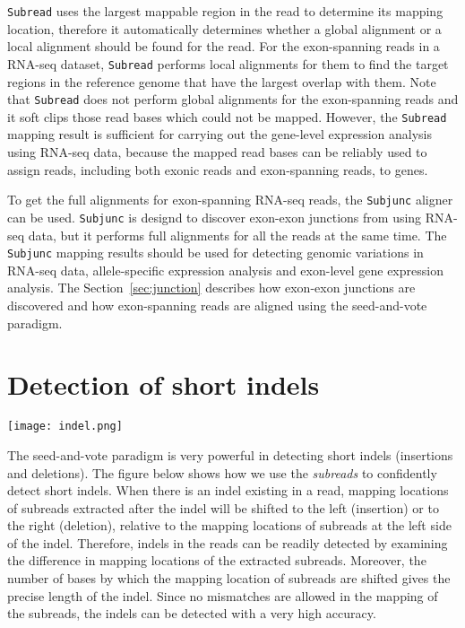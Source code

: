 \documentclass[12pt]{report}
\newcommand{\code}[1]{{\small\texttt{#1}}}
\begin{document}
\code{Subread} uses the largest mappable region in the read to determine its mapping location, therefore it automatically determines whether a global alignment or a local alignment should be found for the read.
For the exon-spanning reads in a RNA-seq dataset, \code{Subread} performs local alignments for them to find the target regions in the reference genome that have the largest overlap with them.
Note that \code{Subread} does not perform global alignments for the exon-spanning reads and it soft clips those read bases which could not be mapped.
However, the \code{Subread} mapping result is sufficient for carrying out the gene-level expression analysis using RNA-seq data, because the mapped read bases can be reliably used to assign reads, including both exonic reads and exon-spanning reads, to genes.

To get the full alignments for exon-spanning RNA-seq reads, the \code{Subjunc} aligner can be used.
\code{Subjunc} is designd to discover exon-exon junctions from using RNA-seq data, but it performs full alignments for all the reads at the same time. 
The \code{Subjunc} mapping results should be used for detecting genomic variations in RNA-seq data, allele-specific expression analysis and exon-level gene expression analysis.
The Section~\ref{sec:junction} describes how exon-exon junctions are discovered and how exon-spanning reads are aligned using the seed-and-vote paradigm.

\section{Detection of short indels}

\begin{center}
\texttt{[image: indel.png]}
\end{center}

The seed-and-vote paradigm is very powerful in detecting short indels (insertions and deletions).
The figure below shows how we use the \emph{subreads} to confidently detect short indels.
When there is an indel existing in a read, mapping locations of subreads extracted after the indel will be shifted to the left (insertion) or to the right (deletion), relative to the mapping locations of subreads at the left side of the indel.
Therefore, indels in the reads can be readily detected by examining the difference in mapping locations of the extracted subreads.
Moreover, the number of bases by which the mapping location of subreads are shifted gives the precise length of the indel.
Since no mismatches are allowed in the mapping of the subreads, the indels can be detected with a very high accuracy.
\end{document}
